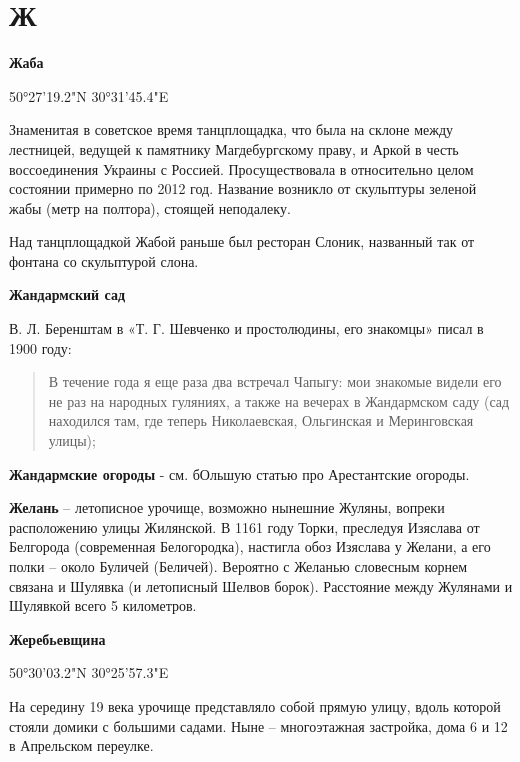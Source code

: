 \chapter*{Ж}

\textbf{Жаба}

50°27'19.2"N 30°31'45.4"E

Знаменитая в советское время танцплощадка, что была на склоне между лестницей, ведущей к памятнику Магдебургскому праву, и Аркой в честь воссоединения Украины с Россией. Просуществовала в относительно целом состоянии  примерно по 2012 год. Название возникло от скульптуры зеленой жабы (метр на полтора), стоящей неподалеку.

Над танцплощадкой Жабой раньше был ресторан Слоник, названный так от фонтана со скульптурой слона.\\

\medskip

\textbf{Жандармский сад} 

В. Л. Беренштам в «Т. Г. Шевченко и простолюдины, его знакомцы» писал в 1900 году:

\begin{quotation}
В течение года я еще раза два встречал Чапыгу: мои знакомые видели его не раз на народных гуляниях, а также на вечерах в Жандармском саду (сад находился там, где теперь Николаевская, Ольгинская и Меринговская улицы);
\end{quotation}

\medskip


\textbf{Жандармские огороды} - см. бОльшую статью про Арестантские огороды.\\

\medskip


\textbf{Желань} – летописное урочище, возможно нынешние Жуляны, вопреки расположению улицы Жилянской. В 1161 году Торки, преследуя Изяслава от Белгорода (современная Белогородка), настигла обоз Изяслава у Желани, а его полки – около Буличей (Беличей). Вероятно с Желанью словесным корнем связана и Шулявка (и летописный Шелвов борок). Расстояние между Жулянами и Шулявкой всего 5 километров.\\ 

\medskip

\textbf{Жеребьевщина}

50°30'03.2"N 30°25'57.3"E

На середину 19 века урочище представляло собой прямую улицу, вдоль которой стояли домики с большими садами. Ныне – многоэтажная застройка, дома 6 и 12 в Апрельском переулке.

